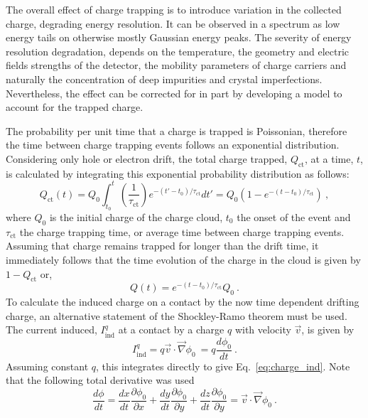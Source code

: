 The overall effect of charge trapping is to introduce variation in the collected charge, degrading energy resolution. It can be observed in a spectrum as low energy tails on otherwise mostly Gaussian energy peaks. The severity of energy resolution degradation, depends on the temperature, the geometry and electric fields strengths of the detector, the mobility parameters of charge carriers and naturally the concentration of deep impurities and crystal imperfections. Nevertheless, the effect can be corrected for in part by developing a model to account for the trapped charge.

The probability per unit time that a charge is trapped is Poissonian, therefore the time between charge trapping events follows an exponential distribution. Considering only hole or electron drift, the total charge trapped, $Q_\text{ct}$, at a time, $t$, is calculated by integrating this exponential probability distribution as follows:
\begin{equation}
	Q_\text{ct}(t) = Q_0\int_{t_0}^{t}\left(\frac{1}{\tau_\text{ct}}\right)e^{-(t'-t_0)/\tau_\text{ct}}dt' = Q_0(1-e^{-(t-t_0)/\tau_\text{ct}})~,
\end{equation}
where $Q_0$ is the initial charge of the charge cloud, $t_0$ the onset of the event and $\tau_\text{ct}$ the charge trapping time, or average time between charge trapping events. Assuming that charge remains trapped for longer than the drift time, it immediately follows that the time evolution of the charge in the cloud is given by $1-Q_\text{ct}$ or,
\begin{equation}
	Q(t) = e^{-(t-t_0)/\tau_\text{ct}}Q_0~.
	\label{eq:exp_decay_charge}
\end{equation}
To calculate the induced charge on a contact by the now time dependent drifting charge, an alternative statement of the Shockley-Ramo theorem must be used. The current induced, $I^q_\text{ind}$ at a contact by a charge $q$ with velocity $\vec{v}$, is given by
\begin{equation}
	I^q_\text{ind} = q\vec{v}\cdot\vec{\nabla}\phi_0~ = q\frac{d\phi_0}{dt}~.
	\label{eq:curr_induced_charge}
\end{equation} 
Assuming constant $q$, this integrates directly to give Eq.~\ref{eq:charge_ind}. Note that the following total derivative was used
\begin{equation}
	\frac{d\phi}{dt} = \frac{dx}{dt}\frac{\partial\phi_0}{\partial x} + \frac{dy}{dt}\frac{\partial\phi_0}{\partial y} + \frac{dz}{dt}\frac{\partial\phi_0}{\partial y} = \vec{v}\cdot\vec{\nabla}\phi_0~.
\end{equation}
